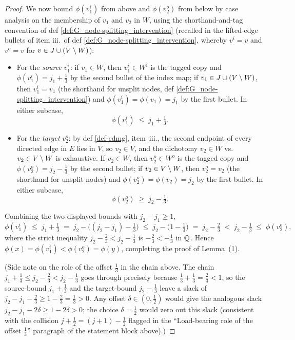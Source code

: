 \documentclass[main]{subfiles}
\begin{document}
\begin{proof}
We now bound $\phi(v_1^i)$ from above and $\phi(v_2^o)$ from below by case analysis on the membership of $v_1$ and $v_2$ in $W$, using the shorthand-and-tag convention of def \ref{def:G_node-splitting_intervention} (recalled in the lifted-edge bullets of item iii.\ of def \ref{def:G_node-splitting_intervention}, whereby $v^i = v$ and $v^o = v$ for $v \in J \cup (V \setminus W)$):
\begin{itemize}
    \item For the \emph{source} $v_1^i$: if $v_1 \in W$, then $v_1^i \in W^i$ is the tagged copy and $\phi(v_1^i) = j_1 + \tfrac{1}{3}$ by the second bullet of the index map; if $v_1 \in J \cup (V \setminus W)$, then $v_1^i = v_1$ (the shorthand for unsplit nodes, def \ref{def:G_node-splitting_intervention}) and $\phi(v_1^i) = \phi(v_1) = j_1$ by the first bullet. In either subcase,
        \[
            \phi(v_1^i) \;\le\; j_1 + \tfrac{1}{3}.
        \]
    \item For the \emph{target} $v_2^o$: by def \ref{def-cdmg}, item~iii., the second endpoint of every directed edge in $E$ lies in $V$, so $v_2 \in V$, and the dichotomy $v_2 \in W$ vs.\ $v_2 \in V \setminus W$ is exhaustive. If $v_2 \in W$, then $v_2^o \in W^o$ is the tagged copy and $\phi(v_2^o) = j_2 - \tfrac{1}{3}$ by the second bullet; if $v_2 \in V \setminus W$, then $v_2^o = v_2$ (the shorthand for unsplit nodes) and $\phi(v_2^o) = \phi(v_2) = j_2$ by the first bullet. In either subcase,
        \[
            \phi(v_2^o) \;\ge\; j_2 - \tfrac{1}{3}.
        \]
\end{itemize}

Combining the two displayed bounds with $j_2 - j_1 \ge 1$,
\[
    \phi(v_1^i) \;\le\; j_1 + \tfrac{1}{3}
                \;=\; j_2 - \bigl( (j_2 - j_1) - \tfrac{1}{3} \bigr)
                \;\le\; j_2 - \bigl( 1 - \tfrac{1}{3} \bigr)
                \;=\; j_2 - \tfrac{2}{3}
                \;<\; j_2 - \tfrac{1}{3}
                \;\le\; \phi(v_2^o),
\]
where the strict inequality $j_2 - \tfrac{2}{3} < j_2 - \tfrac{1}{3}$ is $-\tfrac{2}{3} < -\tfrac{1}{3}$ in $\mathbb{Q}$. Hence $\phi(x) = \phi(v_1^i) < \phi(v_2^o) = \phi(y)$, completing the proof of Lemma~(1).

(Side note on the role of the offset $\tfrac{1}{3}$ in the chain above. The chain $j_1 + \tfrac{1}{3} \le j_2 - \tfrac{2}{3} < j_2 - \tfrac{1}{3}$ goes through precisely because $\tfrac{1}{3} + \tfrac{1}{3} = \tfrac{2}{3} < 1$, so the source-bound $j_1 + \tfrac{1}{3}$ and the target-bound $j_2 - \tfrac{1}{3}$ leave a slack of $j_2 - j_1 - \tfrac{2}{3} \ge 1 - \tfrac{2}{3} = \tfrac{1}{3} > 0$. Any offset $\delta \in (0, \tfrac{1}{2})$ would give the analogous slack $j_2 - j_1 - 2\delta \ge 1 - 2\delta > 0$; the choice $\delta = \tfrac{1}{2}$ would zero out this slack (consistent with the collision $j + \tfrac{1}{2} = (j+1) - \tfrac{1}{2}$ flagged in the ``Load-bearing role of the offset $\tfrac{1}{3}$'' paragraph of the statement block above).)


\end{proof}
\end{document}
